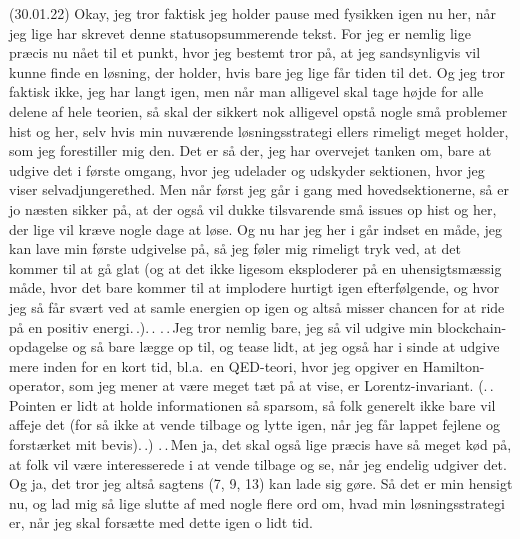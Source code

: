 \documentclass{report}
\begin{document}
(30.01.22) Okay, jeg tror faktisk jeg holder pause med fysikken igen nu her, når jeg lige har skrevet denne statusopsummerende tekst. For jeg er nemlig lige præcis nu nået til et punkt, hvor jeg bestemt tror på, at jeg sandsynligvis vil kunne finde en løsning, der holder, hvis bare jeg lige får tiden til det. Og jeg tror faktisk ikke, jeg har langt igen, men når man alligevel skal tage højde for alle delene af hele teorien, så skal der sikkert nok alligevel opstå nogle små problemer hist og her, selv hvis min nuværende løsningsstrategi ellers rimeligt meget holder, som jeg forestiller mig den. Det er så der, jeg har overvejet tanken om, bare at udgive det i første omgang, hvor jeg udelader og udskyder sektionen, hvor jeg viser selvadjungerethed. Men når først jeg går i gang med hovedsektionerne, så er jo næsten sikker på, at der også vil dukke tilsvarende små issues op hist og her, der lige vil kræve nogle dage at løse. Og nu har jeg her i går indset en måde, jeg kan lave min første udgivelse på, så jeg føler mig rimeligt tryk ved, at det kommer til at gå glat (og at det ikke ligesom eksploderer på en uhensigtsmæssig måde, hvor det bare kommer til at implodere hurtigt igen efterfølgende, og hvor jeg så får svært ved at samle energien op igen og altså misser chancen for at ride på en positiv energi.\,.).\,. .\,.\,Jeg tror nemlig bare, jeg så vil udgive min blockchain-opdagelse og så bare lægge op til, og tease lidt, at jeg også har i sinde at udgive mere inden for en kort tid, bl.a.\ en QED-teori, hvor jeg opgiver en Hamilton-operator, som jeg mener at være meget tæt på at vise, er Lorentz-invariant. (.\,.\,Pointen er lidt at holde informationen så sparsom, så folk generelt ikke bare vil affeje det (for så ikke at vende tilbage og lytte igen, når jeg får lappet fejlene og forstærket mit bevis).\,.) .\,.\,Men ja, det skal også lige præcis have så meget kød på, at folk vil være interesserede i at vende tilbage og se, når jeg endelig udgiver det. Og ja, det tror jeg altså sagtens (7, 9, 13) kan lade sig gøre. Så det er min hensigt nu, og lad mig så lige slutte af med nogle flere ord om, hvad min løsningsstrategi er, når jeg skal forsætte med dette igen o lidt tid.
\end{document}
